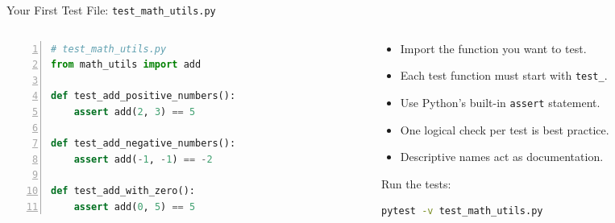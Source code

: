 \begin{frame}{Your First Test File: \texttt{test\_math\_utils.py}}
\setlength{\leftmargini}{0.5cm}
\begin{columns}[c,t,totalwidth=1.0\textwidth]
\begin{column}[c]{0.49\linewidth}
\begin{lstlisting}[style=fullwidth,language=python,numbers=left]
# test_math_utils.py
from math_utils import add

def test_add_positive_numbers():
    assert add(2, 3) == 5

def test_add_negative_numbers():
    assert add(-1, -1) == -2

def test_add_with_zero():
    assert add(0, 5) == 5
\end{lstlisting}
\end{column}
\begin{column}[c]{0.49\linewidth}
\begin{block}{}
\begin{itemize}
\item Import the function you want to test.
\item Each test function must start with \texttt{test\_}.
\item Use Python's built-in \texttt{assert} statement.
\item One logical check per test is best practice.
\item Descriptive names act as documentation.
\end{itemize}
\end{block}
Run the tests:
\begin{lstlisting}[style=fullwidth,language=bash,numbers=none]
pytest -v test_math_utils.py
\end{lstlisting}
\end{column}
\end{columns}
\end{frame}

